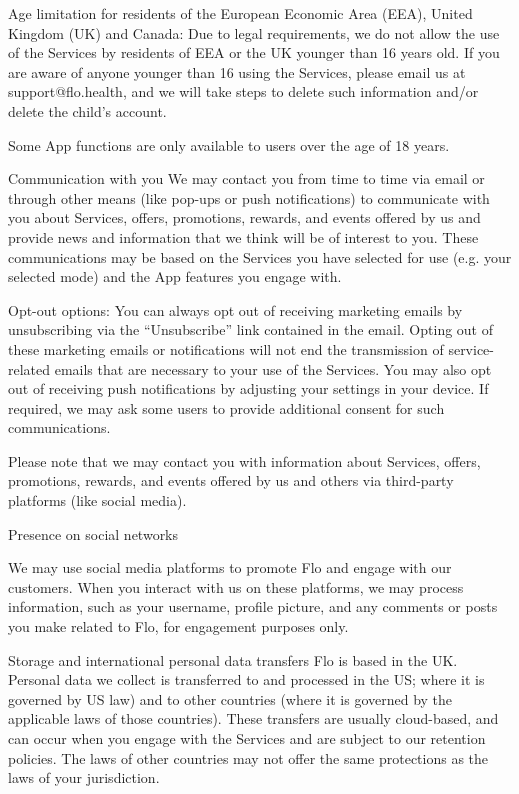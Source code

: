Age limitation for residents of the European Economic Area (EEA), United Kingdom (UK) and Canada: Due to legal requirements, we do not allow the use of the Services by residents of EEA or the UK younger than 16 years old. If you are aware of anyone younger than 16 using the Services, please email us at support@flo.health, and we will take steps to delete such information and/or delete the child’s account. 

Some App functions are only available to users over the age of 18 years.

Communication with you
We may contact you from time to time via email or through other means (like pop-ups or push notifications) to communicate with you about Services, offers, promotions, rewards, and events offered by us and provide news and information that we think will be of interest to you. These communications may be based on the Services you have selected for use (e.g. your selected mode) and the App features you engage with.

Opt-out options: You can always opt out of receiving marketing emails by unsubscribing via the “Unsubscribe” link contained in the email. Opting out of these marketing emails or notifications will not end the transmission of service-related emails that are necessary to your use of the Services. You may also opt out of receiving push notifications by adjusting your settings in your device. If required, we may ask some users to provide additional consent for such communications.

Please note that we may contact you with information about Services, offers, promotions, rewards, and events offered by us and others via third-party platforms (like social media). 

Presence on social networks 

We may use social media platforms to promote Flo and engage with our customers. When you interact with us on these platforms, we may process information, such as your username, profile picture, and any comments or posts you make related to Flo, for engagement purposes only.

Storage and international personal data transfers
Flo is based in the UK. Personal data we collect is transferred to and processed in the US; where it is governed by US law) and to other countries (where it is governed by the applicable laws of those countries). These transfers are usually cloud-based, and can occur when you engage with the Services and are subject to our retention policies. The laws of other countries may not offer the same protections as the laws of your jurisdiction.

